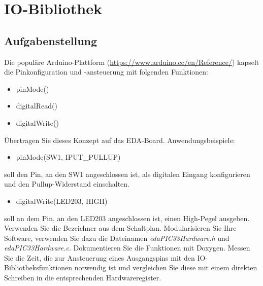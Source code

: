 \section{IO-Bibliothek}
\subsection{Aufgabenstellung}
Die populäre Arduino-Plattform (\url{https://www.arduino.cc/en/Reference/}) 
kapselt die Pinkonfiguration und -ansteuerung mit folgenden Funktionen:
\begin{itemize}
\item pinMode()
\item digitalRead()
\item digitalWrite()
\end{itemize}
Übertragen Sie dieses Konzept auf das EDA-Board. Anwendungsbeispiele:
\begin{itemize}
\item pinMode(SW1, IPUT\_PULLUP)
\end{itemize}
soll den Pin, an den SW1 angeschlossen ist, als digitalen Eingang konfigurieren und den Pullup-Widerstand einschalten.
\begin{itemize}
	\item digitalWrite(LED203, HIGH)
\end{itemize}
soll an dem Pin, an den LED203 angeschlossen ist,
einen High-Pegel ausgeben.
Verwenden Sie die Bezeichner aus dem Schaltplan.
Modularisieren Sie Ihre Software, verwenden Sie dazu die Dateinamen \textit{edaPIC33Hardware.h} und \textit{edaPIC33Hardware.c}.\newline \newline
Dokumentieren Sie die Funktionen mit Doxygen.\newline \newline
Messen Sie die Zeit, die zur Ansteuerung eines Ausgangspins mit den IO-Bibliotheksfunktionen notwendig ist
und vergleichen Sie diese mit einem direkten Schreiben in die entsprechenden Hardwareregister.

